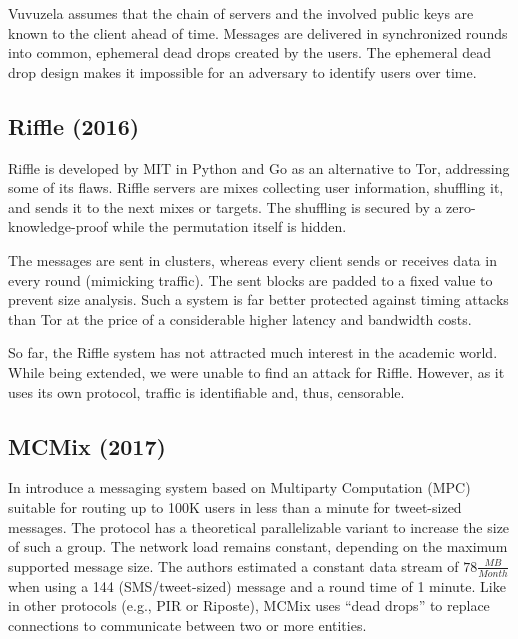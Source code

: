 Vuvuzela assumes that the chain of servers and the involved public keys are known to the client ahead of time. Messages are delivered in synchronized rounds into common, ephemeral dead drops created by the users. The ephemeral dead drop design makes it impossible for an adversary to identify users over time. 

\subsection{Riffle (2016)} %
Riffle\cite{kwon2016riffle} is developed by MIT in Python and Go as an alternative to Tor, addressing some of its flaws. Riffle servers are mixes collecting user information, shuffling it, and sends it to the next mixes or targets. The shuffling is secured by a zero-knowledge-proof while the permutation itself is hidden.

The messages are sent in clusters, whereas every client sends or receives data in every round (mimicking traffic). The sent blocks are padded to a fixed value to prevent size analysis. Such a system is far better protected against timing attacks than Tor at the price of a considerable higher latency and bandwidth costs. 

So far, the Riffle system has not attracted much interest in the academic world. While being extended, we were unable to find an attack for Riffle. However, as it uses its own protocol, traffic is identifiable and, thus, censorable.

%

%

%

\subsection{MCMix (2017)}
In \cite{alexopoulos2017mcmix} \citeauthor{alexopoulos2017mcmix} introduce a messaging system based on Multiparty Computation (MPC) suitable for routing up to 100K users in less than a minute for tweet-sized messages. The protocol has a theoretical parallelizable variant to increase the size of such a group. The network load remains constant, depending on the maximum supported message size. The authors estimated a constant data stream of $78 \frac{MB}{Month}$ when using a 144 (SMS/tweet-sized) message and a round time of 1 minute. Like in other protocols (e.g., PIR or Riposte), MCMix uses ``dead drops'' to replace connections to communicate between two or more entities. 

